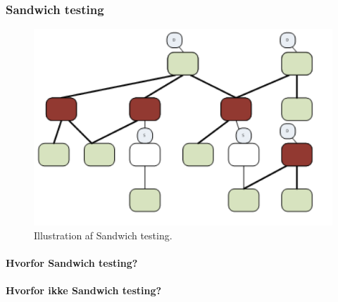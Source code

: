 
\subsubsection{Sandwich testing}

\begin{figure}
\centering
\includegraphics[width=0.7\linewidth]{figs/sandwich.PNG}
\caption{Illustration af Sandwich testing.}
\label{fig:sandwich}
\end{figure}

\paragraph{Hvorfor Sandwich testing?}

\paragraph{Hvorfor ikke Sandwich testing?}